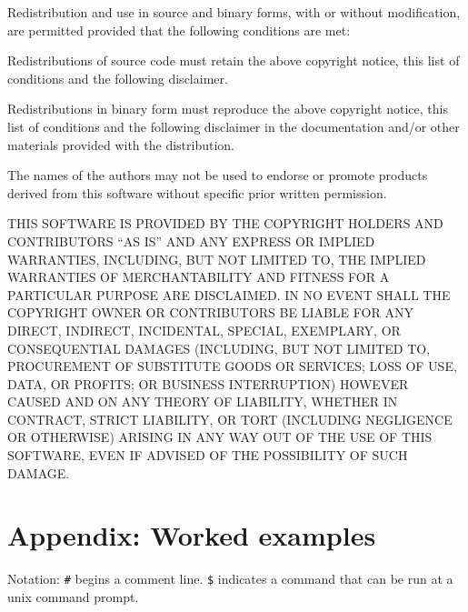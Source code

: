 \documentclass[12pt,letterpaper]{article}
\begin{document}
Redistribution and use in source and binary forms, with or without
modification, are permitted provided that the following conditions are
met:
\begin{compactitem}

    \item Redistributions of source code must retain the above copyright
      notice, this list of conditions and the following disclaimer.
    \item Redistributions in binary form must reproduce the above
      copyright notice, this list of conditions and the following
      disclaimer in the documentation and/or other materials provided
      with the distribution.
    \item The names of the authors may not be used to endorse or promote
      products derived from this software without specific prior
      written permission.

\end{compactitem}

 THIS SOFTWARE IS PROVIDED BY THE COPYRIGHT HOLDERS AND CONTRIBUTORS
 ``AS IS'' AND ANY EXPRESS OR IMPLIED WARRANTIES, INCLUDING, BUT NOT
 LIMITED TO, THE IMPLIED WARRANTIES OF MERCHANTABILITY AND FITNESS FOR
 A PARTICULAR PURPOSE ARE DISCLAIMED. IN NO EVENT SHALL THE COPYRIGHT
 OWNER OR CONTRIBUTORS BE LIABLE FOR ANY DIRECT, INDIRECT, INCIDENTAL,
 SPECIAL, EXEMPLARY, OR CONSEQUENTIAL DAMAGES (INCLUDING, BUT NOT
 LIMITED TO, PROCUREMENT OF SUBSTITUTE GOODS OR SERVICES; LOSS OF USE,
 DATA, OR PROFITS; OR BUSINESS INTERRUPTION) HOWEVER CAUSED AND ON ANY
 THEORY OF LIABILITY, WHETHER IN CONTRACT, STRICT LIABILITY, OR TORT
 (INCLUDING NEGLIGENCE OR OTHERWISE) ARISING IN ANY WAY OUT OF THE USE
 OF THIS SOFTWARE, EVEN IF ADVISED OF THE POSSIBILITY OF SUCH DAMAGE.


\addtolength{\bibsep}{-8pt}
%

\begin{raggedright}
\end{raggedright}

\appendix

\section{Appendix: Worked examples}

Notation: \verb|#| begins a comment line. \verb|$| indicates a command
that can be run at a unix command prompt.
\end{document}
